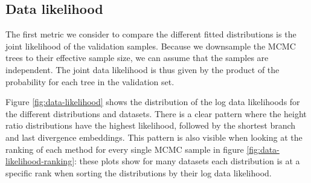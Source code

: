 \documentclass[10pt,letterpaper]{article}
\begin{document}
\subsection*{Data likelihood}

The first metric we consider to compare the different fitted distributions is the joint likelihood of the validation samples. Because we downsample the MCMC trees to their effective sample size, we can assume that the samples are independent. The joint data likelihood is thus given by the product of the probability for each tree in the validation set.

Figure \ref{fig:data-likelihood} shows the distribution of the log data likelihoods for the different distributions and datasets. There is a clear pattern where the height ratio distributions have the highest likelihood, followed by the shortest branch and last divergence embeddings. This pattern is also visible when looking at the ranking of each method for every single MCMC sample in figure \ref{fig:data-likelihood-ranking}: these plots show for many datasets each distribution is at a specific rank when sorting the distributions by their log data likelihood.
\end{document}
